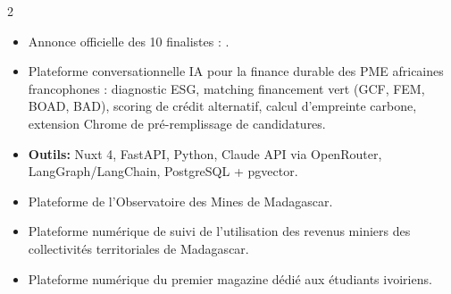 \documentclass[10pt,a4paper,ragged2e,withhyper]{altacv}
\begin{document}
\begin{paracol}{2}
            \begin{itemize}
                \item Annonce officielle des 10 finalistes : .
                \item Plateforme conversationnelle IA pour la finance durable des PME africaines francophones : diagnostic ESG, matching financement vert (GCF, FEM, BOAD, BAD), scoring de crédit alternatif, calcul d'empreinte carbone, extension Chrome de pré-remplissage de candidatures.
                \item \textcolor{SecondaryColor}{\textbf{Outils: }} Nuxt 4, FastAPI, Python, Claude API via OpenRouter, LangGraph/LangChain, PostgreSQL + pgvector.
            \end{itemize}
            \newpage

            \begin{itemize}
                \item Plateforme de l'Observatoire des Mines de Madagascar.
            \end{itemize}
            \divider

            \begin{itemize}
                \item Plateforme numérique de suivi de l'utilisation des revenus miniers des collectivités territoriales de Madagascar.
            \end{itemize}
            \divider

            \begin{itemize}
                \item Plateforme numérique du premier magazine dédié aux étudiants ivoiriens.
            \end{itemize}
            \divider


\end{paracol}
\end{document}
